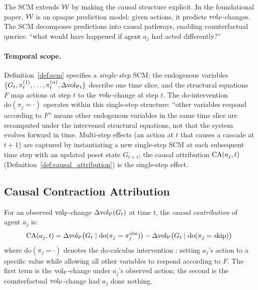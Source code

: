The SCM extends $\mathcal{W}$ by making the causal structure explicit. In the
foundational paper, $\mathcal{W}$ is an opaque prediction model: given
actions, it predicts ${\operatorname{vol}_{\mathrm{P}}}$-changes. The SCM decomposes predictions into
causal pathways, enabling counterfactual queries: ``what would have happened
if agent $a_j$ had acted differently?''

\paragraph{Temporal scope.} Definition~\ref{def:scm} specifies a
\emph{single-step} SCM: the endogenous variables
$\{G_t, \pi_t^{(1)}, \ldots, \pi_t^{(n)}, \Delta {\operatorname{vol}_{\mathrm{P}}}_t\}$ describe
one time slice, and the structural equations $F$ map actions at step
$t$ to the ${\operatorname{vol}_{\mathrm{P}}}$-change at step $t$. The do-intervention
$\mathrm{do}(\pi_j = \cdot)$ operates within this single-step
structure: ``other variables respond according to $F$'' means other
endogenous variables in the same time slice are recomputed under the
intervened structural equations, not that the system evolves forward
in time. Multi-step effects (an action at $t$ that causes a cascade
at $t+1$) are captured by instantiating a new single-step SCM at
each subsequent time step with an updated poset state $G_{t+1}$;
the causal attribution $\mathrm{CA}(a_j, t)$
(Definition~\ref{def:causal_attribution}) is the single-step effect.

\subsection{Causal Contraction Attribution}

\begin{definition}
\label{def:causal_attribution}
For an observed ${\operatorname{vol}_{\mathrm{P}}}$-change $\Delta {\operatorname{vol}_{\mathrm{P}}}(G_t)$ at time $t$, the
    \emph{causal contribution} of agent $a_j$ is:
\begin{equation}
\label{eq:causal_attribution}
\mathrm{CA}(a_j, t) = \Delta {\operatorname{vol}_{\mathrm{P}}}\bigl(G_t \mid \mathrm{do}(\pi_j =
    \pi_j^{\mathrm{obs}})\bigr)
    - \Delta {\operatorname{vol}_{\mathrm{P}}}\bigl(G_t \mid \mathrm{do}(\pi_j = \mathrm{skip})\bigr)
\end{equation}
where $\mathrm{do}(\pi_j = \cdot)$ denotes the do-calculus intervention
    \citep{pearl2009causality}: setting $a_j$'s action to a specific value
    while allowing all other variables to respond according to $F$. The
    first term is the ${\operatorname{vol}_{\mathrm{P}}}$-change under $a_j$'s observed action; the
    second is the counterfactual ${\operatorname{vol}_{\mathrm{P}}}$-change had $a_j$ done nothing.
\end{definition}


